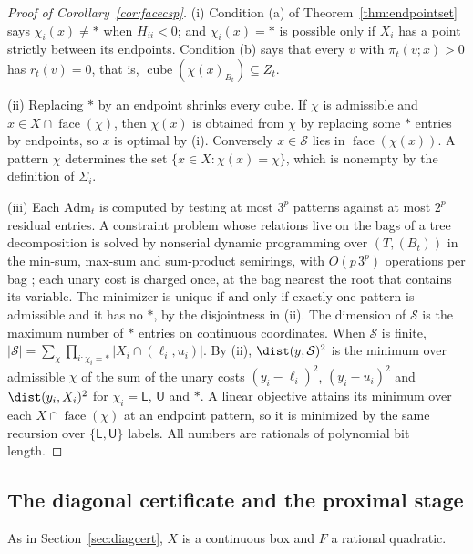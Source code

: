 \begin{proof}[Proof of Corollary~\ref{cor:facecsp}]
(i) Condition (a) of Theorem~\ref{thm:endpointset} says $\chi_i(x)\ne\ast$
when $H_{ii}<0$; and $\chi_i(x)=\ast$ is possible only if $X_i$ has a point
strictly between its endpoints. Condition (b) says that every $v$ with
$\pi_t(v;x)>0$ has $r_t(v)=0$, that is,
$\operatorname{cube}(\chi(x)_{B_t})\subseteq Z_t$.

(ii) Replacing $\ast$ by an endpoint shrinks every cube. If $\chi$ is
admissible and $x\in X\cap\operatorname{face}(\chi)$, then $\chi(x)$ is
obtained from $\chi$ by replacing some $\ast$ entries by endpoints, so $x$ is
optimal by (i). Conversely $x\in\mathcal S$ lies in
$\operatorname{face}(\chi(x))$. A pattern $\chi$ determines the set
$\{x\in X:\chi(x)=\chi\}$, which is nonempty by the definition of $\Sigma_i$.

(iii) Each $\mathrm{Adm}_t$ is computed by testing at most $3^p$ patterns
against at most $2^p$ residual entries. A constraint problem whose relations
live on the bags of a tree decomposition is solved by nonserial dynamic
programming over $(T,(B_t))$ in the min-sum, max-sum and sum-product
semirings, with $O(p\,3^p)$ operations per bag \cite{Dechter1999}; each unary
cost is charged once, at the bag nearest the root that contains its variable.
The minimizer is unique if and only if exactly one pattern is admissible and
it has no $\ast$, by the disjointness in (ii). The dimension of $\mathcal S$
is the maximum number of $\ast$ entries on continuous coordinates. When
$\mathcal S$ is finite,
$|\mathcal S|=\sum_\chi\prod_{i:\chi_i=\ast}|X_i\cap(\ell_i,u_i)|$. By (ii),
$\dist(y,\mathcal S)^2$ is the minimum over admissible $\chi$ of the sum of
the unary costs $(y_i-\ell_i)^2$, $(y_i-u_i)^2$ and $\dist(y_i,X_i)^2$ for
$\chi_i=\mathsf L$, $\mathsf U$ and $\ast$. A linear objective attains its
minimum over each $X\cap\operatorname{face}(\chi)$ at an endpoint pattern, so
it is minimized by the same recursion over $\{\mathsf L,\mathsf U\}$ labels.
All numbers are rationals of polynomial bit length.
\end{proof}

\subsection{The diagonal certificate and the proximal stage}

As in Section~\ref{sec:diagcert}, $X$ is a continuous box and $F$ a rational
quadratic.

